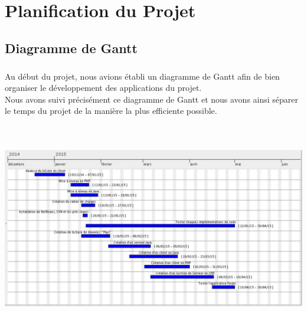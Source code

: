\chapter{Planification du Projet}
\section{Diagramme de Gantt}
\paragraph{} Au début du projet, nous avions établi un diagramme de Gantt afin de bien organiser le développement des applications du projet.\\
Nous avons suivi précisément ce diagramme de Gantt et nous avons ainsi séparer le temps du projet de la manière la plus efficiente possible.\\
\break
\includegraphics[height= 10cm, width=15cm]{project/images/Image8}

